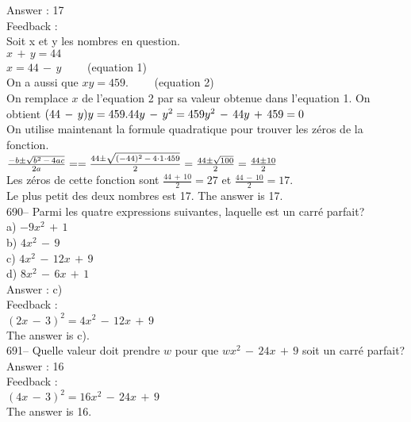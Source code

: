 ﻿\documentclass[letterpaper, 12pt]{article}
\begin{document}
Answer : 17\\

Feedback : \\
Soit x et y les nombres en question.\\
$x\,+\,y=44$\\
$x=44\,-\,y \qquad$ (equation 1)\\
On a aussi que $xy=459. \qquad$ (equation 2)\\
On remplace $x$ de l'equation 2 par sa valeur obtenue dans l'equation 1.
On obtient $(44\,-\,y)y=459.\\
44y\,-\,y^{2}=459\\
y^{2}\,-\,44y\,+\,459=0$\\

On utilise maintenant la formule quadratique pour trouver les z\'eros de la
fonction.\\[2mm]
$\frac{-b\pm \sqrt{b^{2}\,-\,4ac}}{2a}=\\[2mm]
=\frac{44\pm\sqrt{(-44)^{2}\,-\,4\cdot1\cdot459}}{2}\\[2mm]
=\frac{44\pm \sqrt{100}}{2}\\[2mm]
=\frac{44\pm 10}{2}$\\[2mm]
Les z\'eros de cette fonction sont $\frac{44\,+\,10}{2}=27$ et
$\frac{44\,-\,10}{2}=17$.\\[2mm]
Le plus petit des deux nombres est 17.  The answer is 17.\\


690-- Parmi les quatre expressions suivantes, laquelle est un carr\'e
parfait?\\
a) $-9x^{2}\,+\,1$\\
b) $4x^{2}\,-\,9$\\
c) $4x^{2}\,-\,12x\,+\,9$\\
d) $8x^{2}\,-\,6x\,+\,1$\\

Answer : c)\\

Feedback : \\
$(2x\,-\,3)^{2}=4x^{2}\,-\,12x\,+\,9$\\
The answer is c).\\

691-- Quelle valeur doit prendre $w$ pour que $wx^{2}\,-\,24x\,+\,9$ soit un
carr\'e parfait?\\

Answer : 16\\

Feedback : \\
$(4x\,-\,3)^{2}=16x^{2}\,-\,24x\,+\,9$\\
The answer is 16.\\
\end{document}
